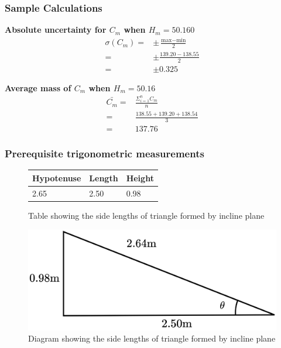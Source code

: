 \documentclass[11pt,a4paper]{article}
\begin{document}
\subsubsection{Sample Calculations}
\begin{center}
\textbf{Absolute uncertainty for $C_m$ when $H_m=50.160$}
\begin{align*}
	\sigma(C_m)=&\pm\frac{\textrm{max}-\textrm{min}}{2}\\
	=&\pm\frac{139.20-138.55}{2}
	\\=&\pm0.325
\end{align*}
\newline

\textbf{Average mass of $C_m$ when $H_m=50.16$}
\begin{align*}
	\bar{C_m}=&\frac{\Sigma^n_{i=1}C_m}{n}\\
	=&\frac{138.55+139.20+138.54}{3}\\
	=&137.76
\end{align*}
\end{center}


\subsubsection{Prerequisite trigonometric measurements}

\begin{figure}[H]
	\centering

	\begin{tabular}{|l|l|l|}
		\hline
		\textbf{Hypotenuse} & \textbf{Length} & \textbf{Height} \\ \hline
		2.65       & 2.50   & 0.98   \\ \hline
	\end{tabular}

	\caption{Table showing the side lengths of triangle formed by incline plane}
\end{figure}


\begin{figure}[H]
	\centering
	\includegraphics[width=0.35\paperwidth]{./Diagrams/LengthDiagram.png}
	\caption{Diagram showing the side lengths of triangle formed by incline plane}
\end{figure}
\end{document}
